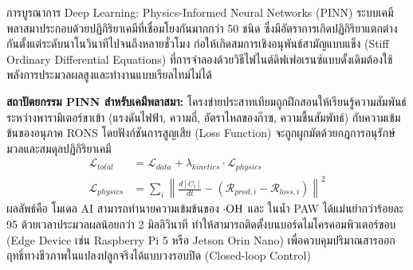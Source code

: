 \begin{aibox}{การบูรณาการ Deep Learning: Physics-Informed Neural Networks (PINN)}
ระบบเคมีพลาสมาประกอบด้วยปฏิกิริยาเคมีที่เชื่อมโยงกันมากกว่า 50 ชนิด ซึ่งมีอัตราการเกิดปฏิกิริยาแตกต่างกันตั้งแต่ระดับนาโนวินาทีไปจนถึงหลายชั่วโมง ก่อให้เกิดสมการเชิงอนุพันธ์สามัญแบบแข็ง (Stiff Ordinary Differential Equations) ที่การจำลองด้วยวิธีไฟไนต์ดิฟเฟอเรนซ์แบบดั้งเดิมต้องใช้พลังการประมวลผลสูงและทำงานแบบเรียลไทม์ไม่ได้

\textbf{สถาปัตยกรรม PINN สำหรับเคมีพลาสมา:} โครงข่ายประสาทเทียมถูกฝึกสอนให้เรียนรู้ความสัมพันธ์ระหว่างพารามิเตอร์ขาเข้า (แรงดันไฟฟ้า, ความถี่, อัตราไหลของก๊าซ, ความชื้นสัมพัทธ์) กับความเข้มข้นของอนุภาค RONS โดยฟังก์ชันการสูญเสีย (Loss Function) จะถูกผูกมัดด้วยกฎการอนุรักษ์มวลและสมดุลปฏิกิริยาเคมี
\begin{equation}
\begin{aligned}
    \mathcal{L}_{total} &= \mathcal{L}_{data} + \lambda_{kinetics} \cdot \mathcal{L}_{physics} \\
    \mathcal{L}_{physics} &= \sum_{i} \left\| \frac{d[C_i]}{dt} - \left( \mathcal{R}_{prod, i} - \mathcal{R}_{loss, i} \right) \right\|^2
\end{aligned}
\end{equation}
ผลลัพธ์คือ โมเดล AI สามารถทำนายความเข้มข้นของ $\cdot\ce{OH}$ และ  ในน้ำ PAW ได้แม่นยำกว่าร้อยละ 95 ด้วยเวลาประมวลผลน้อยกว่า 2 มิลลิวินาที ทำให้สามารถติดตั้งบนบอร์ดไมโครคอมพิวเตอร์ขอบ (Edge Device เช่น Raspberry Pi 5 หรือ Jetson Orin Nano) เพื่อควบคุมปริมาณสารออกฤทธิ์ทางชีวภาพในแปลงปลูกจริงได้แบบวงรอบปิด (Closed-loop Control)
\end{aibox}


